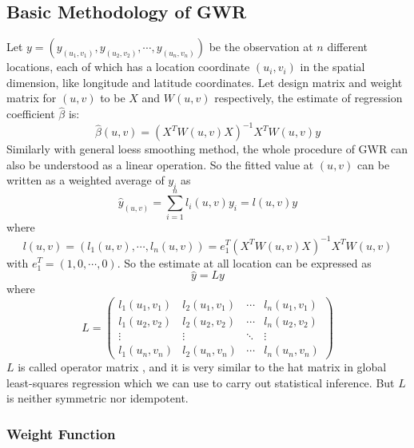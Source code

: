 \subsection{Basic Methodology of GWR}

Let $y=(y_{(u_1,v_1)}, y_{(u_2,v_2)}, \cdots, y_{(u_n,v_n)})$ be the observation 
at $n$ different locations, each of which has a location coordinate $(u_i, v_i)$ 
in the spatial dimension, like longitude and latitude coordinates. Let design matrix 
and weight matrix for $(u, v)$ to be $X$ and $W(u, v)$ respectively, the estimate 
of regression coefficient $\hat \beta$ is:
\begin{equation}
\hat \beta(u, v) = (X^TW(u,v)X)^{-1}X^TW(u,v)y
\end{equation}
Similarly with general loess smoothing method, the whole procedure of GWR can
also be understood as a linear operation. So the fitted value at $(u, v)$ can 
be written as a weighted average of $y_i$ as
\begin{equation}
\hat y_{(u,v)} = \sum_{i=1}^n l_i(u,v)y_i = l(u,v)y
\end{equation}
where
\begin{equation}
l(u,v) = (l_1(u,v), \cdots, l_n(u,v)) = e_1^T(X^TW(u,v)X)^{-1}X^TW(u,v)
\end{equation}
with $e_1^T = (1,0,\cdots,0)$. So the estimate at all location can be expressed
as
\begin{equation}
\hat y = Ly
\end{equation}
where 
\begin{equation}
L =  
\begin{pmatrix}
  l_1(u_1,v_1) & l_2(u_1,v_1) & \cdots & l_n(u_1,v_1) \\
  l_1(u_2,v_2) & l_2(u_2,v_2) & \cdots & l_n(u_2,v_2) \\
  \vdots  & \vdots & \ddots & \vdots  \\
  l_1(u_n,v_n) & l_2(u_n,v_n) & \cdots & l_n(u_n,v_n) 
\end{pmatrix}
\end{equation}
$L$ is called operator matrix \cite{hafen2010local}, and it is very similar to the
hat matrix in global least-squares regression which we can use to carry out 
statistical inference. But $L$ is neither symmetric nor idempotent.

\subsubsection{Weight Function}

